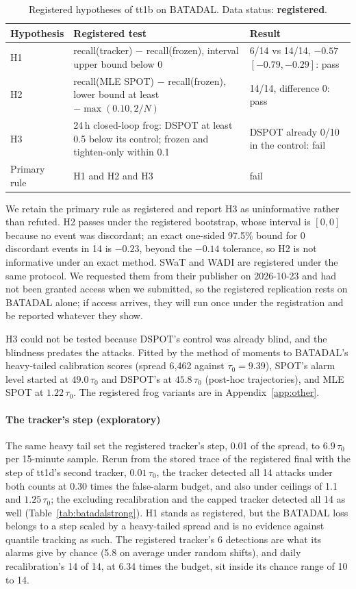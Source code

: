 \documentclass[letterpaper,twocolumn,10pt]{article}
\begin{document}
\begin{table}[t]
\caption{Registered hypotheses of tt1b on BATADAL. Data status: \textbf{registered}.}
\label{tab:tt1b}
\begin{tabular}{@{}p{}p{}p{}@{}}
\toprule
Hypothesis & Registered test & Result \\
\midrule
H1 & recall(tracker) $-$ recall(frozen), interval upper bound below 0 & 6/14 vs 14/14, $-0.57$ $[-0.79, -0.29]$: pass \\
H2 & recall(MLE SPOT) $-$ recall(frozen), lower bound at least $-\max(0.10, 2/N)$ & 14/14, difference 0: pass \\
H3 & 24\,h closed-loop frog: DSPOT at least 0.5 below its control; frozen and tighten-only within 0.1 & DSPOT already 0/10 in the control: fail \\
Primary rule & H1 and H2 and H3 & fail \\
\bottomrule
\end{tabular}
\end{table}

We retain the primary rule as registered and report H3 as uninformative rather than refuted. H2
passes under the registered bootstrap, whose interval is $[0, 0]$ because no event was discordant; an
exact one-sided 97.5\% bound for 0 discordant events in 14 is $-0.23$, beyond the $-0.14$ tolerance,
so H2 is not informative under an exact method. SWaT and WADI are registered under the same protocol.
We requested them from their publisher on 2026-10-23 and had not been granted access when we
submitted, so the registered replication rests on BATADAL alone; if access arrives, they will run once
under the registration and be reported whatever they show.

H3 could not be tested because DSPOT's control was already blind, and the blindness predates the
attacks. Fitted by the method of moments to BATADAL's heavy-tailed calibration scores (spread 6,462
against $\tau_0 = 9.39$), SPOT's alarm level started at $49.0\,\tau_0$ and DSPOT's at $45.8\,\tau_0$
(post-hoc trajectories), and MLE SPOT at
$1.22\,\tau_0$. The registered frog variants are in Appendix~\ref{app:other}.

\paragraph{The tracker's step (exploratory)}
The same heavy tail set the registered tracker's step, 0.01 of the spread, to $6.9\,\tau_0$ per
15-minute sample. Rerun from the stored trace of the registered final with the step of tt1d's second
tracker, $0.01\,\tau_0$, the tracker detected all 14 attacks under both counts at 0.30 times the
false-alarm budget, and also under ceilings of 1.1 and $1.25\,\tau_0$; the excluding recalibration and
the capped tracker detected all 14 as well (Table~\ref{tab:batadalstrong}). H1 stands as registered, but
the BATADAL loss belongs to a step scaled by a heavy-tailed spread and is no evidence against quantile
tracking as such. The registered tracker's 6 detections are what its alarms give by chance
(5.8 on average under random shifts), and daily recalibration's 14 of 14, at 6.34 times the budget,
sit inside its chance range of 10 to 14.
\end{document}
